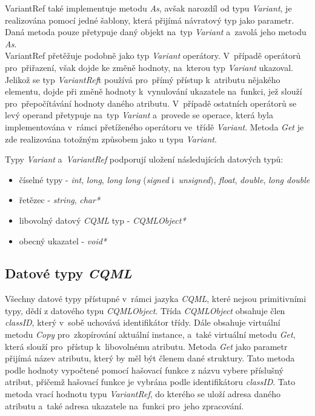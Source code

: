 \documentclass[11pt,twoside,a4paper]{book}
\begin{document}
VariantRef také implementuje metodu \textit{As}, avšak narozdíl od typu \textit{Variant}, je realizována pomocí jedné šablony, která přijímá návratový typ jako parametr. Daná metoda pouze přetypuje daný objekt na~typ \textit{Variant} a~zavolá jeho metodu \textit{As}.\\
VariantRef přetěžuje podobně jako typ \textit{Variant} operátory. V~případě operátorů pro~přiřazení, však dojde ke změně hodnoty, na~kterou typ \textit{Variant} ukazoval. Jelikož se typ \textit{VariantRef}t používá pro~přímý přístup k~atributu nějakého elementu, dojde při změně hodnoty k~vynulování ukazatele na~funkci, jež slouží pro~přepočítávání hodnoty daného atributu. V~případě ostatních operátorů se levý operand přetypuje na~typ \textit{Variant} a~provede se operace, která byla implementována v~rámci přetíženého operátoru ve~třídě \textit{Variant}. Metoda \textit{Get} je zde realizována totožným způsobem jako u typu \textit{Variant}.

Typy \textit{Variant} a~\textit{VariantRef} podporují uložení následujících datových typů:
\begin{itemize}
\item číselné typy - \textit{int}, \textit{long}, \textit{long long} (\textit{signed} i~\textit{unsigned}), \textit{float}, \textit{double}, \textit{long double}
\item řetězec - \textit{string}, \textit{char*}
\item libovolný datový \textit{CQML} typ - \textit{CQMLObject*}
\item obecný ukazatel - \textit{void*}
\end{itemize}

\subsection{Datové typy \textit{CQML}}
Všechny datové typy přístupné v~rámci jazyka \textit{CQML}, které nejsou primitivními typy, dědí z datového typu \textit{CQMLObject}. Třída \textit{CQMLObject} obsahuje člen \textit{classID}, který v~sobě uchovává identifikátor třídy. Dále obsahuje virtuální metodu \textit{Copy} pro~zkopírování aktuální instance, a~také virtuální metodu \textit{Get}, která slouží pro~přístup k~libovolnému atributu. Metoda \textit{Get} jako parametr přijímá název atributu, který by měl být členem dané struktury. Tato metoda podle hodnoty vypočtené pomocí hašovací funkce z názvu vybere příslušný atribut, přičemž hašovací funkce je vybrána podle identifikátoru \textit{classID}. Tato metoda vrací hodnotu typu \textit{VariantRef}, do kterého se uloží adresa daného atributu a~také adresa ukazatele na~funkci pro~jeho zpracování.\\
\end{document}
